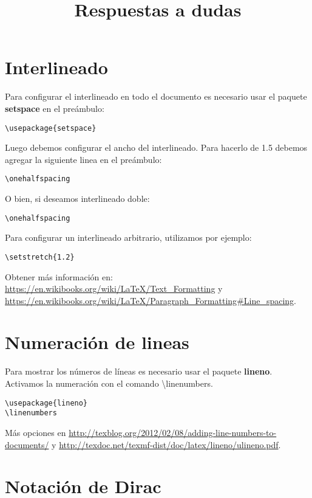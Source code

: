 \documentclass[a4paper,11pt]{article}
\title{\textbf{Respuestas a dudas}}
\date{}
\begin{document}
\maketitle

\section{Interlineado}

Para configurar el interlineado en todo el documento es necesario usar el paquete \textbf{setspace} en el preámbulo:
\begin{verbatim}
\usepackage{setspace}
\end{verbatim}

Luego debemos configurar el ancho del interlineado. Para hacerlo de 1.5 debemos agregar la siguiente linea en el preámbulo:
\begin{verbatim}
\onehalfspacing
\end{verbatim}

O bien, si deseamos interlineado doble:
\begin{verbatim}
\onehalfspacing
\end{verbatim}

Para configurar un interlineado arbitrario, utilizamos por ejemplo:
\begin{verbatim}
\setstretch{1.2}
\end{verbatim}


Obtener más información en: \url{https://en.wikibooks.org/wiki/LaTeX/Text_Formatting} y \url{https://en.wikibooks.org/wiki/LaTeX/Paragraph_Formatting#Line_spacing}.


\section{Numeración de lineas}

Para mostrar los números de líneas es necesario usar el paquete \textbf{lineno}. Activamos la numeración con el comando \textbackslash linenumbers.

\begin{verbatim}
\usepackage{lineno}
\linenumbers
\end{verbatim}

Más opciones en \url{http://texblog.org/2012/02/08/adding-line-numbers-to-documents/} y \url{http://texdoc.net/texmf-dist/doc/latex/lineno/ulineno.pdf}.

\section{Notación de Dirac}
\end{document}
